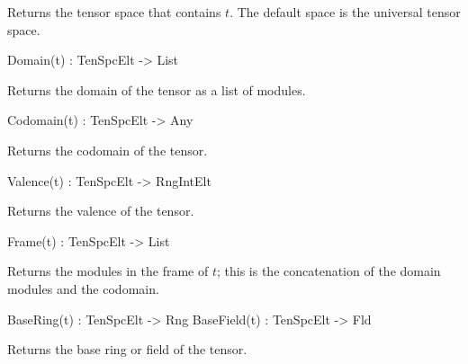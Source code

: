Returns the tensor space that contains $t$. The default space is the universal 
tensor space.

\begin{intrinsics}
Domain(t) : TenSpcElt -> List
\end{intrinsics}

Returns the domain of the tensor as a list of modules.

\begin{intrinsics}
Codomain(t) : TenSpcElt -> Any
\end{intrinsics}

Returns the codomain of the tensor.

\begin{intrinsics}
Valence(t) : TenSpcElt -> RngIntElt
\end{intrinsics}

Returns the valence of the tensor.

\begin{intrinsics}
Frame(t) : TenSpcElt -> List
\end{intrinsics}

Returns the modules in the frame of $t$; this is the concatenation of
the domain modules and the codomain.

\begin{intrinsics}
BaseRing(t) : TenSpcElt -> Rng
BaseField(t) : TenSpcElt -> Fld
\end{intrinsics}

Returns the base ring or field of the tensor.

